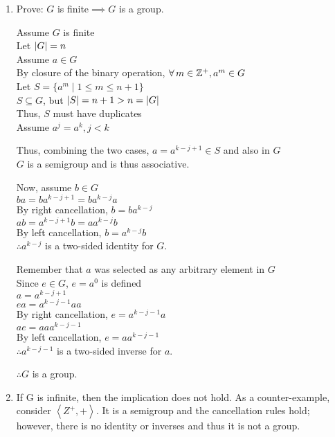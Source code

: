 \documentclass[letterpaper,12pt,fleqn]{article}
\newcommand{\bas}[2]{\left<#1,#2\right>}
\begin{document}
\begin{enumerate}[label=\alph*)]
\item Prove: $G$ is finite$\implies G$ is a group.

  Assume $G$ is finite \\
  Let $\lvert G\rvert=n$ \\
  Assume $a\in G$ \\
  By closure of the binary operation, $\forall\,m\in\mathbb{Z}^+,a^m\in G$ \\
  Let $S=\{a^m\mid 1\le m\le n+1\}$ \\
  $S\subseteq G$, but $\lvert S\rvert=n+1>n=\lvert G\rvert$ \\
  Thus, $S$ must have duplicates \\
  Assume $a^j=a^k,j<k$ \\
  Thus, combining the two cases, $a=a^{k-j+1}\in S$ and also in $G$ \\

  $G$ is a semigroup and is thus associative.

  Now, assume $b\in G$ \\
  $ba=ba^{k-j+1}=ba^{k-j}a$ \\
  By right cancellation, $b=ba^{k-j}$ \\
  $ab=a^{k-j+1}b=aa^{k-j}b$ \\
  By left cancellation, $b=a^{k-j}b$ \\
  $\therefore a^{k-j}$ is a two-sided identity for $G$.

  Remember that $a$ was selected as any arbitrary element in $G$ \\
  Since $e\in G$, $e=a^0$ is defined \\
  $a=a^{k-j+1}$ \\
  $ea=a^{k-j-1}aa$ \\
  By right cancellation, $e=a^{k-j-1}a$ \\
  $ae=aaa^{k-j-1}$ \\
  By left cancellation, $e=aa^{k-j-1}$ \\
  $\therefore a^{k-j-1}$ is a two-sided inverse for $a$.

  $\therefore G$ is a group.

\item If G is infinite, then the implication does not hold. As a
  counter-example, consider $\bas{Z^+}{+}$. It is a semigroup and the
  cancellation rules hold; however, there is no identity or inverses and
  thus it is not a group.
\end{enumerate}
\end{document}
